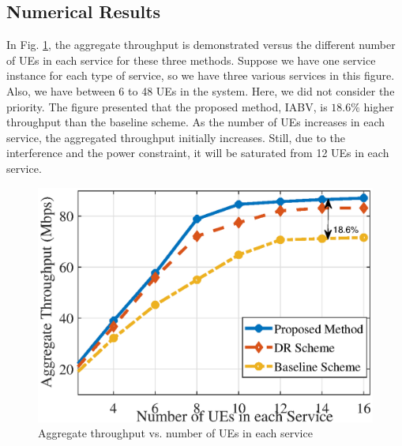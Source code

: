 \documentclass[lettersize,journal]{IEEEtran}
\begin{document}
\subsection{Numerical Results}
In Fig. \ref{fig:1}, the aggregate throughput is demonstrated versus the different number of UEs in each service for these three methods. Suppose we have one service instance for each type of service, so we have three various services in this figure. Also, we have between 6 to 48 UEs in the system.
Here, we did not consider the priority. The figure presented that the proposed method, IABV, is $18.6\%$ higher throughput than the baseline scheme.
As the number of UEs increases in each service, the aggregated throughput initially increases. Still, due to the interference and the power constraint, it will be saturated from 12 UEs in each service.
\begin{figure}%
  \centering
  \captionsetup{justification=centering}
    \includegraphics[scale = 0.5]{fig/Arate_ue1_1n.eps}
    \caption{Aggregate throughput vs. number of UEs in each service}%
    \label{fig:1}
\end{figure}
\end{document}
